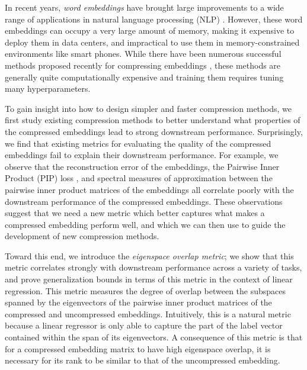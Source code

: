 In recent years, \textit{word embeddings} \citep{word2vec13,glove14,fasttext18} have brought large improvements to a wide range of applications in natural language processing (NLP) \citep{collins16,drqa17}.
However, these word embeddings can occupy a very large amount of memory, making it expensive to deploy them in data centers, and impractical to use them in memory-constrained environments like smart phones.
While there have been numerous successful methods proposed recently for compressing embeddings \citep{sparse16,andrews16,dccl17,kway18}, these methods are generally quite computationally expensive and training them requires tuning many hyperparameters.%

To gain insight into how to design simpler and faster compression methods, we first study existing compression methods to better understand what properties of the compressed embeddings lead to strong downstream performance.
Surprisingly, we find that existing metrics for evaluating the quality of the compressed embeddings fail to explain their downstream performance.
For example, we observe that the reconstruction error of the embeddings, the Pairwise Inner Product (PIP) loss \citep{yin18}, and spectral measures of approximation between the pairwise inner product matrices of the embeddings \citep{avron17,lprff18} all correlate poorly with the downstream performance of the compressed embeddings.
These observations suggest that we need a new metric which better captures what makes a compressed embedding perform well, and which we can then use to guide the development of new compression methods.

Toward this end, we introduce the \textit{eigenspace overlap metric};
we show that this metric correlates strongly with downstream performance across a variety of tasks, and prove generalization bounds in terms of this metric in the context of linear regression.
This metric measures the degree of overlap between the subspaces spanned by the eigenvectors of the pairwise inner product matrices of the compressed and uncompressed embeddings.
Intuitively, this is a natural metric because a linear regressor is only able to capture the part of the label vector contained within the span of its eigenvectors.
A consequence of this metric is that for a compressed embedding matrix to have high eigenspace overlap, it is necessary for its rank to be similar to that of the uncompressed embedding.

